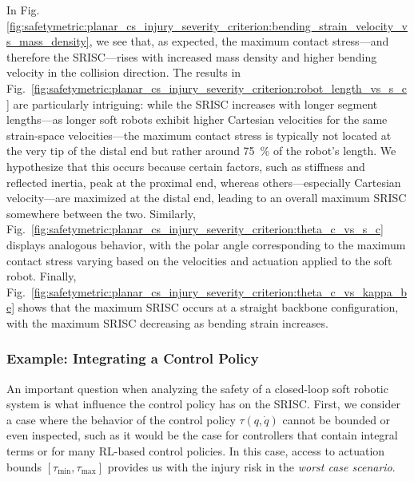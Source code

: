 In Fig.\ref{fig:safetymetric:planar_cs_injury_severity_criterion:bending_strain_velocity_vs_mass_density}, we see that, as expected, the maximum contact stress—and therefore the \gls{SRISC}—rises with increased mass density and higher bending velocity in the collision direction. The results in Fig.~\ref{fig:safetymetric:planar_cs_injury_severity_criterion:robot_length_vs_s_c} are particularly intriguing: while the \gls{SRISC} increases with longer segment lengths—as longer soft robots exhibit higher Cartesian velocities for the same strain-space velocities—the maximum contact stress is typically not located at the very tip of the distal end but rather around \SI{75}{\percent} of the robot’s length. We hypothesize that this occurs because certain factors, such as stiffness and reflected inertia, peak at the proximal end, whereas others—especially Cartesian velocity—are maximized at the distal end, leading to an overall maximum \gls{SRISC} somewhere between the two. Similarly, Fig.~\ref{fig:safetymetric:planar_cs_injury_severity_criterion:theta_c_vs_s_c} displays analogous behavior, with the polar angle corresponding to the maximum contact stress varying based on the velocities and actuation applied to the soft robot. Finally, Fig.~\ref{fig:safetymetric:planar_cs_injury_severity_criterion:theta_c_vs_kappa_be} shows that the maximum \gls{SRISC} occurs at a straight backbone configuration, with the maximum \gls{SRISC} decreasing as bending strain increases.

\subsubsection{Example: Integrating a Control Policy}
An important question when analyzing the safety of a closed-loop soft robotic system is what influence the control policy has on the \gls{SRISC}.
First, we consider a case where the behavior of the control policy $\tau(q,\dot{q})$ cannot be bounded or even inspected, such as it would be the case for controllers that contain integral terms or for many RL-based control policies.
In this case, access to actuation bounds $[\tau_\mathrm{min}, \tau_\mathrm{max}]$ provides us with the injury risk in the \emph{worst case scenario}.

